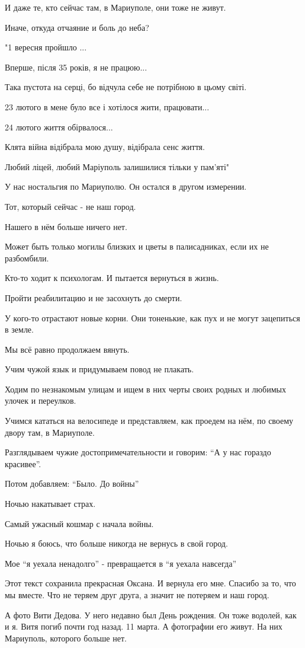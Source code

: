 И даже те, кто сейчас там,  в Мариуполе, они тоже не живут. 

Иначе, откуда  отчаяние и боль до неба? 

"1 вересня пройшло ... 

Вперше, після 35 років, я не працюю... 

Така пустота на серці, бо відчула себе не потрібною в цьому світі. 

23 лютого в мене було все і хотілося жити, працювати...

24 лютого життя обірвалося... 

Клята війна відібрала мою душу, відібрала сенс життя. 

Любий ліцей, любий Маріуполь залишилися тільки у пам'яті"

У нас ностальгия по Мариуполю. Он   остался в другом измерении.  

Тот,  который сейчас - не наш город. 

Нашего в нём больше ничего нет.

Может быть только могилы близких и цветы в палисадниках, если их не разбомбили. 

Кто-то ходит к психологам. И пытается вернуться в жизнь.

Пройти реабилитацию и не засохнуть до смерти. 

У кого-то отрастают новые корни. Они тоненькие, как пух и не могут зацепиться в
земле. 

Мы всё равно  продолжаем вянуть. 

Учим чужой язык и придумываем повод не плакать. 

Ходим по незнакомым  улицам и ищем в них черты своих родных и любимых улочек и
переулков. 

Учимся кататься на велосипеде и представляем, как проедем на нём,  по своему
двору там, в Мариуполе. 

Разглядываем чужие достопримечательности и говорим: \enquote{А у нас гораздо красивее}. 

Потом добавляем: \enquote{Было. До войны}

Ночью накатывает страх. 

Самый ужасный кошмар с начала войны. 

Ночью я боюсь, что больше никогда не вернусь в свой город. 

Мое \enquote{я уехала ненадолго} -  превращается в \enquote{я уехала навсегда}

Этот текст сохранила прекрасная Оксана. И вернула его мне. Спасибо за то, что
мы вместе. Что не теряем друг друга, а значит не потеряем и наш  город. 

А фото Вити  Дедова. У него недавно был День рождения. Он тоже водолей, как и
я. Витя погиб почти год назад. 11 марта.  А фотографии его живут. На них
Мариуполь, которого больше нет.

